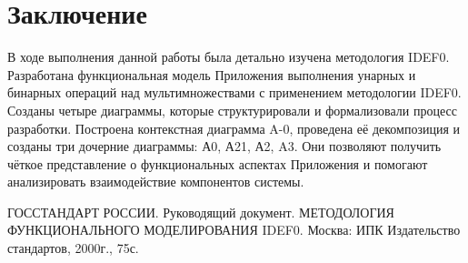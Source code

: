 \documentclass[a4paper, final]{article}
\begin{document}
\newpage
\section*{Заключение}

В ходе выполнения данной работы была детально изучена методология IDEF0. Разработана функциональная модель Приложения выполнения унарных и бинарных операций над мультимножествами с применением методологии IDEF0. Созданы четыре диаграммы, которые структурировали и формализовали процесс разработки. Построена контекстная диаграмма A-0, проведена её декомпозиция и созданы три дочерние диаграммы: А0, А21, А2, A3. Они позволяют получить чёткое представление о функциональных аспектах Приложения и помогают анализировать взаимодействие компонентов системы.


\newpage
{}
\begin{thebibliography}{}
	 ГОССТАНДАРТ РОССИИ. Руководящий документ. МЕТОДОЛОГИЯ ФУНКЦИОНАЛЬНОГО МОДЕЛИРОВАНИЯ IDEF0. Москва: ИПК Издательство стандартов,
	2000г., 75с.
\end{thebibliography}
\thispagestyle{empty}

\newpage
\end{document}
